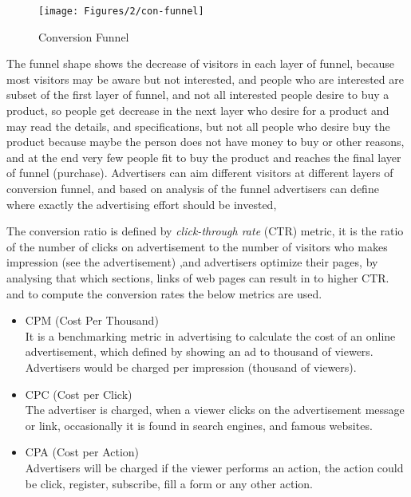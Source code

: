 \begin{figure}[H]
\centering
\texttt{[image: Figures/2/con-funnel]}
\caption{Conversion Funnel}
\label{fig:conversion_funnel}
\end{figure}

The funnel shape shows the decrease of visitors in each layer of funnel, because most visitors may be aware but not interested, and people who are interested are subset of the first layer of funnel, and not all interested people desire to buy a product, so people get decrease in the next layer who desire for a product and may read the details, and specifications, but not all people who desire buy the product because maybe the person does not have money to buy or other reasons, and at the end very few people fit to buy the product and reaches the final layer of funnel (purchase). 
Advertisers can aim different visitors at different layers of conversion funnel, and based on analysis of the funnel advertisers can define where exactly the advertising effort should be invested, \cite{ad_effor_funnel}


The conversion ratio is defined by \emph{click-through rate} (CTR) metric, it is the ratio of the number of clicks on advertisement to the number of visitors who makes impression (see the advertisement) \cite{convfunnel},and advertisers optimize their pages, by analysing that which sections, links of web pages can result in to higher CTR. and to compute the conversion rates the below metrics are used.


\begin{itemize}
\item CPM (Cost Per Thousand) \\
It is a benchmarking metric in advertising to calculate the cost of an online advertisement, which defined by showing an ad to thousand of viewers. Advertisers would be charged per impression (thousand of viewers). 

\item CPC (Cost per Click) \\
The advertiser is charged, when a viewer clicks on the advertisement message or link, occasionally it is found in search engines, and famous websites. 

\item CPA (Cost per Action)\\
Advertisers will be charged if the viewer performs an action, the action could be click, register, subscribe, fill a form or any other action.

\end{itemize}





